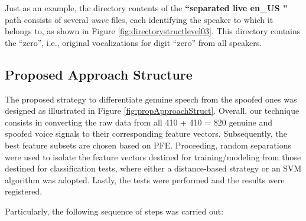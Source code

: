 		\par Just as an example, the directory contents of the \textbf{``separated \textfractionsolidus live \textfractionsolidus en\_US ''} path consists of several \textit{wave} files, each identifying the speaker to which it belongs to, as shown in Figure \ref{fig:directorystructlevel03}. This directory contains the ``zero'', i.e., original vocalizations for digit ``zero'' from all speakers.
	\subsection{Proposed Approach Structure}
		\par The proposed strategy to differentiate genuine speech from the spoofed ones was designed as illustrated in Figure \ref{fig:propApproachStruct}. Overall, our technique consists in converting the raw data from all 410 + 410 = 820 genuine and spoofed voice signals to their corresponding feature vectors. Subsequently, the best feature subsets are chosen based on PFE. Proceeding, random separations were used to isolate the feature vectors destined for training/modeling from those destined for classification tests, where either a distance-based strategy or an SVM algorithm \cite{bennett2000support} was adopted. Lastly, the tests were performed and the results were registered.
		\\
		\par Particularly, the following sequence of steps was carried out:

